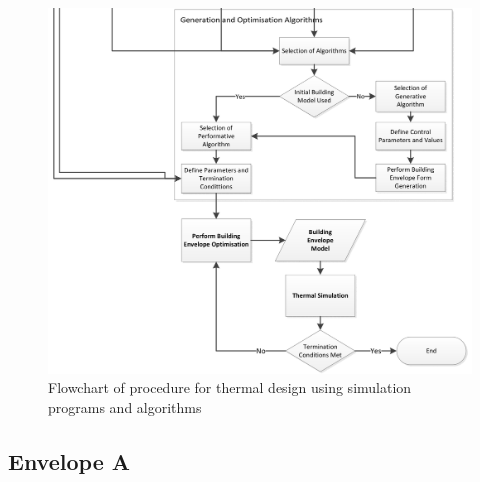 \begin{figure}
	\centering
	\includegraphics[width=18cm]{./Images/9b-Flowchart}
	\caption[Thermal Algorithmic Design Flowchart]{Flowchart of procedure for thermal design using simulation programs and algorithms}
	\label{fig:Ch5Flowchart}
\end{figure}

\clearpage

\subsection{Envelope A}


